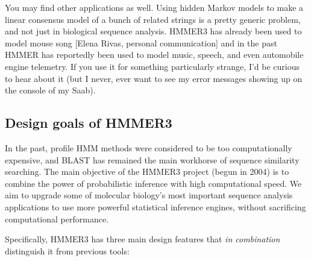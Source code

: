 You may find other applications as well. Using hidden Markov models to
make a linear consensus model of a bunch of related strings is a
pretty generic problem, and not just in biological sequence analysis.
HMMER3 has already been used to model mouse song [Elena Rivas,
  personal communication] and in the past HMMER has reportedly been
used to model music, speech, and even automobile engine telemetry. If
you use it for something particularly strange, I'd be curious to hear
about it (but I never, ever want to see my error messages showing up
on the console of my Saab).




\subsection{Design goals of HMMER3}

In the past, profile HMM methods were considered to be too
computationally expensive, and BLAST has remained the main workhorse
of sequence similarity searching. The main objective of the HMMER3
project (begun in 2004) is to combine the power of probabilistic
inference with high computational speed. We aim to upgrade some of
molecular biology's most important sequence analysis applications to
use more powerful statistical inference engines, without sacrificing
computational performance.

Specifically, HMMER3 has three main design features that \emph{in
combination} distinguish it from previous tools:


